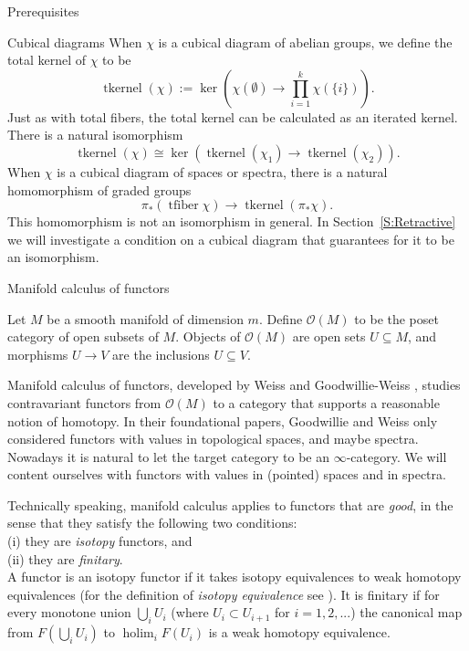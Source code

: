 \documentclass[12pt]{amsart}
\newcommand{\holim}{\operatorname{holim}}
\newcommand{\tfiber}{\operatorname{tfiber}}
\newcommand{\tkernel}{\operatorname{tkernel}}
\theoremstyle{plain}
\theoremstyle{definition}
\theoremstyle{remark}
\begin{document}
\begin{section}{Prerequisites}
\begin{subsection}{Cubical diagrams}
When $\chi$ is a cubical diagram of abelian groups, we define the total kernel of $\chi$ to be 
\[
\tkernel(\chi):=\ker(\chi(\emptyset) \to \prod_{i=1}^k \chi(\{i\}))
.\] 
Just as with total fibers, the total kernel can be calculated as an iterated kernel. There is a natural isomorphism
\[
\tkernel(\chi)\cong \ker(\tkernel(\chi_1)\to \tkernel(\chi_2)).
\]
When $\chi$ is a cubical diagram of spaces or spectra, there is a natural homomorphism of graded groups
\[
\pi_*(\tfiber\chi)\to \tkernel(\pi_*\chi).
\]
This homomorphism is not an isomorphism in general. In Section~\ref{S:Retractive} we will investigate a condition on a cubical diagram that guarantees for it to be an isomorphism.
\end{subsection}
\begin{subsection}{Manifold calculus of functors}\label{SS:manifoldcalculus}

Let $M$ be a smooth manifold of dimension $m$. Define $\mathcal{O}(M)$ to be the poset category of open subsets of $M$. Objects of $\mathcal{O}(M)$ are open sets $U \subseteq M$, and morphisms $U \rightarrow V$ are the inclusions $U \subseteq V$.

Manifold calculus of functors, developed by Weiss \cite{W:EI1} and Goodwillie-Weiss \cite{GW:EI2}, studies contravariant functors from $\mathcal{O}(M)$ to a category that supports a reasonable notion of homotopy. In their foundational papers, Goodwillie and Weiss only considered functors with values in topological spaces, and maybe spectra. Nowadays it is natural to let the target category to be an $\infty$-category. We will content ourselves with functors with values in (pointed) spaces and in spectra. 

Technically speaking, manifold calculus applies to functors that are {\it good}, in the sense that they satisfy the following two conditions:\\
\hspace*{1cm} (i) they are \textit{isotopy} functors, and\\
\hspace*{1cm} (ii) they are \textit{finitary}.\\
A functor is an isotopy functor if it takes isotopy equivalences to weak homotopy equivalences (for the definition of \textit{isotopy equivalence} see \cite[Definition 10.2.2]{MV:Cubes}). It is finitary if for every monotone union $\bigcup_{i} U_i$ (where $U_i \subset U_{i+1}$ for $i=1,2,...$) the canonical map from $F(\bigcup_{i} U_i)$ to $\holim_i F(U_i)$ is a weak homotopy equivalence. %


\end{subsection}
\end{section}
\end{document}
